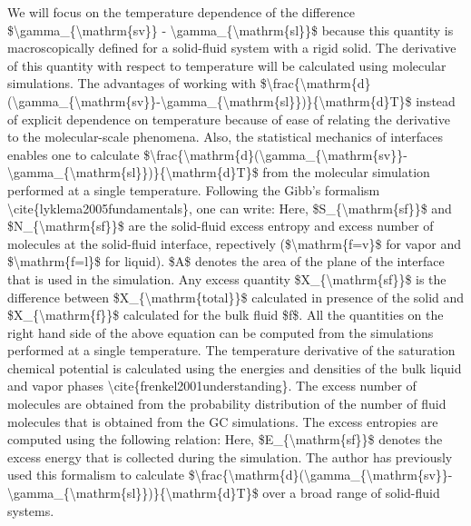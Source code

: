 \par We will focus on the temperature dependence of the difference \$\textbackslash gamma\_\{\textbackslash mathrm\{sv\}\} - \textbackslash gamma\_\{\textbackslash mathrm\{sl\}\}\$ because this quantity is macroscopically defined for a solid-fluid system with a rigid solid. The derivative of this quantity with respect to temperature will be calculated using molecular simulations. The advantages of working with \$\textbackslash frac\{\textbackslash mathrm\{d\}(\textbackslash gamma\_\{\textbackslash mathrm\{sv\}\}-\textbackslash gamma\_\{\textbackslash mathrm\{sl\}\})\}\{\textbackslash mathrm\{d\}T\}\$ instead of explicit dependence on temperature because of ease of relating the derivative to the molecular-scale phenomena. Also, the statistical mechanics of interfaces enables one to calculate \$\textbackslash frac\{\textbackslash mathrm\{d\}(\textbackslash gamma\_\{\textbackslash mathrm\{sv\}\}-\textbackslash gamma\_\{\textbackslash mathrm\{sl\}\})\}\{\textbackslash mathrm\{d\}T\}\$ from the molecular simulation performed at a single temperature. Following the Gibb's formalism \textbackslash cite\{lyklema2005fundamentals\}, one can write: Here, \$S\_\{\textbackslash mathrm\{sf\}\}\$ and \$N\_\{\textbackslash mathrm\{sf\}\}\$ are the solid-fluid excess entropy and excess number of molecules at  the solid-fluid interface, repectively (\$\textbackslash mathrm\{f=v\}\$ for vapor and \$\textbackslash mathrm\{f=l\}\$ for liquid). \$A\$ denotes the area of the plane of the interface that is used in the simulation. Any excess quantity \$X\_\{\textbackslash mathrm\{sf\}\}\$ is the difference between \$X\_\{\textbackslash mathrm\{total\}\}\$ calculated in presence of the solid and \$X\_\{\textbackslash mathrm\{f\}\}\$ calculated for the bulk fluid \$f\$. All the quantities on the right hand side of the above equation can be computed from the simulations performed at a single temperature. The temperature derivative of the saturation chemical potential is calculated using the energies and densities of the bulk liquid and vapor phases \textbackslash cite\{frenkel2001understanding\}. The excess number of molecules are obtained from the probability distribution of the number of fluid molecules that is obtained from the GC simulations. The excess entropies are computed using the following relation: Here, \$E\_\{\textbackslash mathrm\{sf\}\}\$ denotes the excess energy that is collected during the simulation. The author has previously used this formalism to calculate \$\textbackslash frac\{\textbackslash mathrm\{d\}(\textbackslash gamma\_\{\textbackslash mathrm\{sv\}\}-\textbackslash gamma\_\{\textbackslash mathrm\{sl\}\})\}\{\textbackslash mathrm\{d\}T\}\$ over a broad range of solid-fluid systems.
